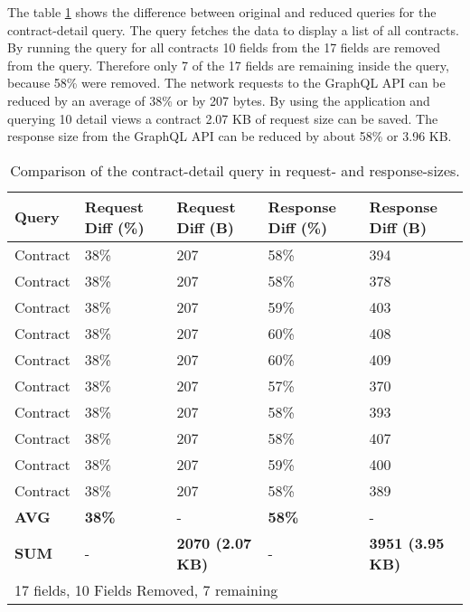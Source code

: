 \noindent The table \ref{table:code:comparison-contract-reduction} shows the difference between original and reduced queries for the contract-detail query. The query fetches the data to display a list of all contracts. By running the query for all contracts 10 fields from the 17 fields are removed from the query. Therefore only 7 of the 17 fields are remaining inside the query, because 58\% were removed. The network requests to the GraphQL \ac{API} can be reduced by an average of 38\% or by 207 bytes. By using the application and querying 10 detail views a contract 2.07 KB of request size can be saved. The response size from the GraphQL \ac{API} can be reduced by about 58\% or 3.96 KB.

\ifshowTables
\begin{table}[H]
  \begin{tabular}{|l|l|l|l|l|}
  \hline
  \textbf{Query} & \textbf{Request Diff (\%)}  & \textbf{Request Diff (B)} & \textbf{Response Diff (\%)} & \textbf{Response Diff (B)}  \\
  \hline
  Contract & 38\% & 207 & 58\% & 394 \\
  \hline
  Contract & 38\% & 207 & 58\% & 378 \\
  \hline
  Contract & 38\% & 207 & 59\% & 403 \\
  \hline
  Contract & 38\% & 207 & 60\% & 408 \\
  \hline
  Contract & 38\% & 207 & 60\% & 409 \\
  \hline
  Contract & 38\% & 207 & 57\% & 370 \\
  \hline
  Contract & 38\% & 207 & 58\% & 393 \\
  \hline
  Contract & 38\% & 207 & 58\% & 407 \\
  \hline
  Contract & 38\% & 207 & 59\% & 400 \\
  \hline
  Contract & 38\% & 207 & 58\% & 389 \\
  \hline
  \hline
  \textbf{AVG} & \textbf{38\%} & - & \textbf{58\%} & - \\
  \hline
  \hline
  \textbf{SUM} & - & \textbf{2070 (2.07 KB)} & - & \textbf{3951 (3.95 KB)} \\
  \hline
  \multicolumn{5}{l}{17 fields, 10 Fields Removed, 7 remaining}
  \end{tabular}
  \caption{Comparison of the contract-detail query in request- and response-sizes.}\label{table:code:comparison-contract-reduction}
\end{table}
\fi